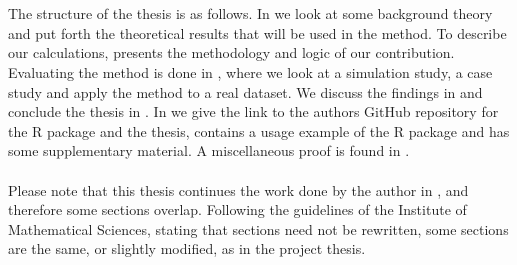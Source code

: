 \\
\\
The structure of the thesis is as follows. In  we look at some background theory and put forth the theoretical results that will be used in the method. To describe our calculations,  presents the methodology and logic of our contribution. Evaluating the method is done in , where we look at a simulation study, a case study and apply the method to a real dataset. We discuss the findings in  and conclude the thesis in . In  we give the link to the authors GitHub repository for the R package and the thesis,  contains a usage example of the R package and  has some supplementary material. A miscellaneous proof is found in . 
\\
\\
Please note that this thesis continues the work done by the author in \citet{Arnstad:Relative_variable_importance_in_Bayesian_linear_mixed_models:2024}, and therefore some sections overlap. Following the guidelines of the Institute of Mathematical Sciences, stating that sections need not be rewritten, some sections are the same, or slightly modified, as in the project thesis.
